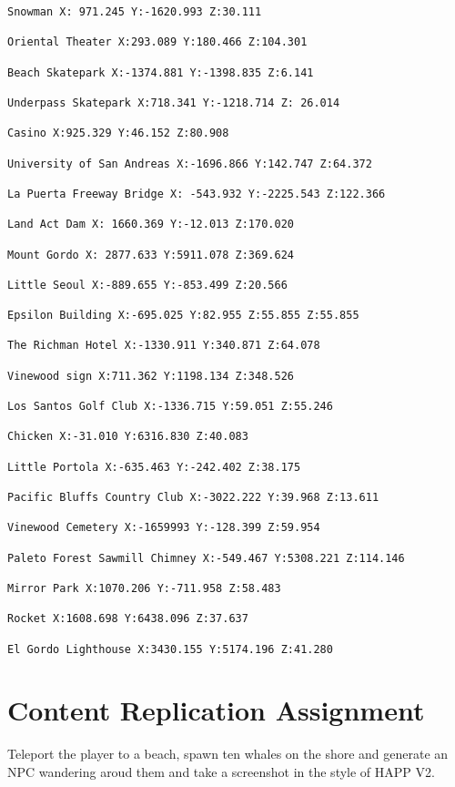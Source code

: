 \documentclass[
  openany]{book}
\begin{document}
\begin{verbatim}
Snowman X: 971.245 Y:-1620.993 Z:30.111

Oriental Theater X:293.089 Y:180.466 Z:104.301

Beach Skatepark X:-1374.881 Y:-1398.835 Z:6.141

Underpass Skatepark X:718.341 Y:-1218.714 Z: 26.014

Casino X:925.329 Y:46.152 Z:80.908

University of San Andreas X:-1696.866 Y:142.747 Z:64.372

La Puerta Freeway Bridge X: -543.932 Y:-2225.543 Z:122.366

Land Act Dam X: 1660.369 Y:-12.013 Z:170.020

Mount Gordo X: 2877.633 Y:5911.078 Z:369.624

Little Seoul X:-889.655 Y:-853.499 Z:20.566

Epsilon Building X:-695.025 Y:82.955 Z:55.855 Z:55.855

The Richman Hotel X:-1330.911 Y:340.871 Z:64.078

Vinewood sign X:711.362 Y:1198.134 Z:348.526

Los Santos Golf Club X:-1336.715 Y:59.051 Z:55.246

Chicken X:-31.010 Y:6316.830 Z:40.083

Little Portola X:-635.463 Y:-242.402 Z:38.175

Pacific Bluffs Country Club X:-3022.222 Y:39.968 Z:13.611

Vinewood Cemetery X:-1659993 Y:-128.399 Z:59.954

Paleto Forest Sawmill Chimney X:-549.467 Y:5308.221 Z:114.146

Mirror Park X:1070.206 Y:-711.958 Z:58.483

Rocket X:1608.698 Y:6438.096 Z:37.637

El Gordo Lighthouse X:3430.155 Y:5174.196 Z:41.280
\end{verbatim}

\hypertarget{content-replication-assignment-4}{%
\section*{Content Replication Assignment}\label{content-replication-assignment-4}}

Teleport the player to a beach, spawn ten whales on the shore and generate an NPC wandering aroud them and take a screenshot in the style of HAPP V2.
\end{document}
